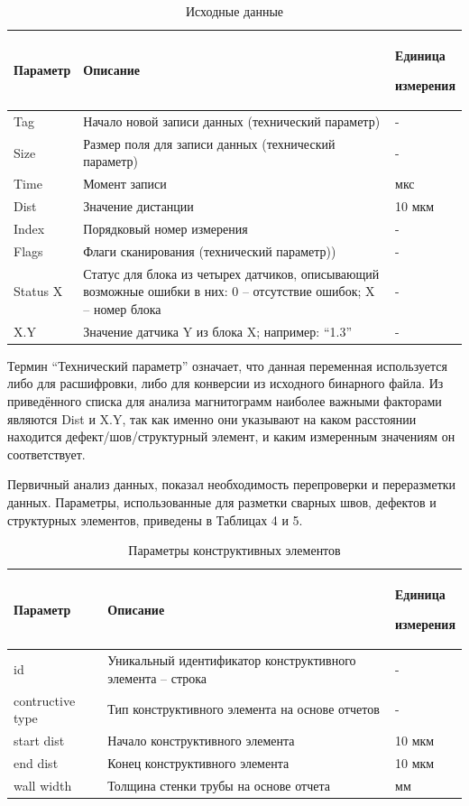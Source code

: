 \documentclass[a4paper,article,14pt]{extarticle}
\begin{document}
\begin{center}
\begin{longtable}{|p{2cm}|p{12cm}|p{2cm}|}
    \caption{Исходные данные}\\\hline
    Параметр & Описание & Единица \par измерения \\ \hline
    Tag & Начало новой записи данных (технический параметр) & - \\ \hline
    Size & Размер поля для записи данных (технический параметр) & - \\ \hline
    Time & Момент записи & мкс \\ \hline
    Dist & Значение дистанции & 10 мкм \\ \hline
    Index & Порядковый номер измерения & - \\ \hline
    Flags & Флаги сканирования (технический параметр)) & - \\ \hline
    Status X & Статус для блока из четырех датчиков, описывающий возможные ошибки в них: 0 – отсутствие ошибок; X – номер блока & - \\ \hline
    X.Y & Значение датчика Y из блока X; например: “1.3” & - \\ \hline
\end{longtable}
\end{center}

Термин “Технический параметр” означает, что данная переменная используется либо для расшифровки, 
либо для конверсии из исходного бинарного файла. Из приведённого списка для анализа магнитограмм 
наиболее важными факторами являются Dist и X.Y, так как именно они указывают на каком расстоянии 
находится дефект/шов/структурный элемент, и каким измеренным значениям он соответствует.

Первичный анализ данных, показал необходимость перепроверки и переразметки данных. Параметры, 
использованные для разметки сварных швов, дефектов и структурных элементов, приведены в Таблицах 4 и 5.

\begin{center}
    \begin{longtable}{|p{2cm}|p{12cm}|p{2cm}|}
        \caption{Параметры конструктивных элементов}\\\hline
        Параметр & Описание & Единица \par измерения \\ \hline
        id & Уникальный идентификатор конструктивного элемента – строка & - \\ \hline
        contructive type & Тип конструктивного элемента на основе отчетов & - \\ \hline
        start dist & Начало конструктивного элемента & 10 мкм \\ \hline
        end dist & Конец конструктивного элемента & 10 мкм \\ \hline
        wall width & Толщина стенки трубы на основе отчета & мм \\ \hline
    \end{longtable}
\end{center}
\end{document}
